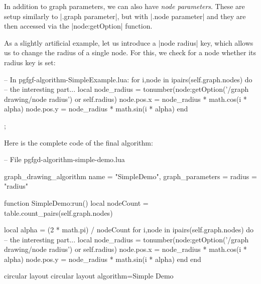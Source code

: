 In addition to graph parameters, we can also have \emph{node
  parameters}. These are setup similarly to |.graph parameter|, but
with |.node parameter| and they are then accessed via the
|node:getOption| function.

As a slightly artificial example, let us introduce a |node radius|
key, which allows us to change the radius of a single node. For this,
we check for a node whether its radius key is set:

\begin{codeexample}
-- In pgfgf-algorithm-SimpleExample.lua:
   for i,node in ipairs(self.graph.nodes) do
      -- the interesting part...
      local node_radius = tonumber(node:getOption('/graph drawing/node radius')
                                   or self.radius)
      node.pos.x = node_radius * math.cos(i * alpha)
      node.pos.y = node_radius * math.sin(i * alpha)
   end
   
\end{codeexample}

\begin{codeexample}[]
\tikz {};
\end{codeexample}

Here is the complete code of the final algorithm:
\begin{codeexample}
-- File pgfgd-algorithm-simple-demo.lua

graph_drawing_algorithm {
  name = "SimpleDemo",
  graph_parameters = {
    radius = "radius"
  }
}

function SimpleDemo:run()
   local nodeCount = table.count_pairs(self.graph.nodes)

   local alpha = (2 * math.pi) / nodeCount
   for i,node in ipairs(self.graph.nodes) do
      -- the interesting part...
      local node_radius = tonumber(node:getOption('/graph drawing/node radius')
                                   or self.radius)
      node.pos.x = node_radius * math.cos(i * alpha)
      node.pos.y = node_radius * math.sin(i * alpha)
   end
end
\end{codeexample}

\begin{codeexample}
  
\pgfgddeclarealgorithmkey
  {circular layout}
  {circular layout}
  {algorithm=Simple Demo}

\end{codeexample}




